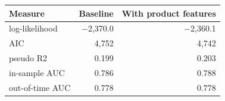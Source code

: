 \begin{tabular}{lrr}
\toprule
Measure & Baseline & With product features \\
\midrule
log-likelihood & $-$2,370.0 & $-$2,360.1 \\
AIC & 4,752 & 4,742 \\
pseudo R2 & 0.199 & 0.203 \\
in-sample AUC & 0.786 & 0.788 \\
out-of-time AUC & 0.778 & 0.778 \\
\bottomrule
\end{tabular}
